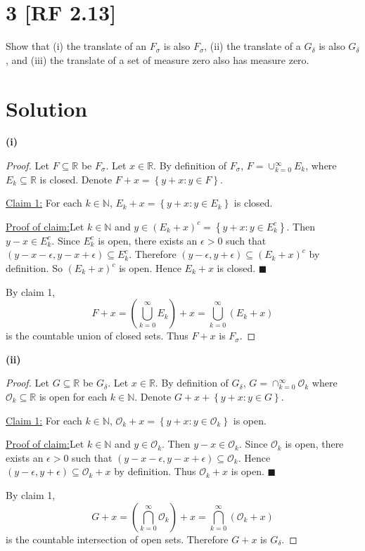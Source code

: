 \documentclass[12pt]{article}
\newenvironment{claimproof}[1]{\par\noindent\underline{Proof of claim:}\space#1}{\hfill $\blacksquare$}
\begin{document}
\newpage
\section*{3 [RF 2.13]}
Show that (i) the translate of an $F_{\sigma}$ is also $F_{\sigma}$, (ii) the translate of a $G_{\delta}$ is also $G_{\delta}$, and (iii) the
translate of a set of measure zero also has measure zero.

\section*{Solution}
{\bf (i)}
\begin{proof}
Let $F\subseteq \mathbb{R}$ be $F_{\sigma}$. Let $x\in\mathbb{R}$. By definition of $F_{\sigma}$, $F = \cup_{k=0}^{\infty}E_{k}$, where
$E_{k}\subseteq \mathbb{R}$ is closed. Denote $F + x = \left\{ y + x : y \in F \right\}$.

\underline{Claim 1:} For each $k \in \mathbb{N}$, $E_{k} + x = \left\{ y + x : y \in E_{k} \right\}$ is closed.

\begin{claimproof}
Let $k \in \mathbb{N}$ and $y \in (E_{k} + x)^{c} = \left\{ y + x : y \in E_{k}^{c} \right\}$. Then $y - x \in E_{k}^{c}$. Since $E_{k}^{c}$ is open,
there exists an $\epsilon > 0$ such that $(y - x - \epsilon, y - x + \epsilon) \subseteq E_{k}^{c}$. Therefore $(y - \epsilon, y + \epsilon) \subseteq
(E_{k} + x)^{c}$ by definition. So $(E_{k} + x)^{c}$ is open. Hence $E_{k} + x$ is closed.
\end{claimproof}

By claim 1, 
\[ F + x = \left( \bigcup_{k=0}^{\infty}E_{k} \right) + x = \bigcup_{k=0}^{\infty}(E_{k} + x) \] 
is the countable union of closed sets. Thus $F + x$ is $F_{\sigma}$.
\end{proof}

{\bf (ii)}
\begin{proof}
Let $G \subseteq \mathbb{R}$ be $G_{\delta}$. Let $x \in \mathbb{R}$. By definition of $G_{\delta}$, $G = \cap_{k=0}^{\infty}\mathcal{O}_{k}$ where
$\mathcal{O}_{k} \subseteq \mathbb{R}$ is open for each $k \in \mathbb{N}$. Denote $G + x + \left\{ y + x : y \in G \right\}$.

\underline{Claim 1:} For each $k \in \mathbb{N}$, $\mathcal{O}_{k} + x = \left\{ y + x : y \in \mathcal{O}_{k} \right\}$ is open.

\begin{claimproof}
Let $k\in\mathbb{N}$ and $y \in \mathcal{O}_{k}$. Then $y - x \in \mathcal{O}_{k}$. Since $\mathcal{O}_{k}$ is open, there exists an $\epsilon > 0$
such that $(y - x - \epsilon, y - x + \epsilon) \subseteq \mathcal{O}_{k}$. Hence $(y - \epsilon, y + \epsilon) \subseteq \mathcal{O}_{k} + x$ by
definition. Thus $\mathcal{O}_{k} + x$ is open.
\end{claimproof}

By claim 1,
\[ G + x = \left( \bigcap_{k=0}^{\infty}\mathcal{O}_{k} \right) + x = \bigcap_{k=0}^{\infty}(\mathcal{O}_{k} + x) \]
is the countable intersection of open sets. Therefore $G + x$ is $G_{\delta}$.
\end{proof}
\end{document}
